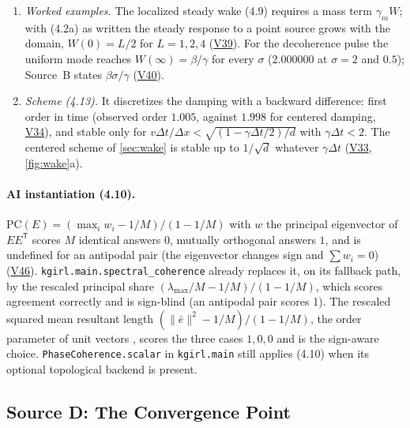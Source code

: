 \documentclass[11pt]{article}
\theoremstyle{definition}
\theoremstyle{remark}
\newcommand{\code}[1]{\texttt{#1}}
\newcommand{\V}[1]{\hyperref[app:verify]{\textsf{#1}}}
\begin{document}
\begin{enumerate}[label=(B\arabic*)]
\item \emph{Worked examples.} The localized steady wake (4.9) requires a mass term $\gamma_mW$; with (4.2a) as written the steady response to a point source grows with the domain, $W(0)=L/2$ for $L=1,2,4$ (\V{V39}). For the decoherence pulse the uniform mode reaches $W(\infty)=\beta/\gamma$ for every $\sigma$ (2.000000 at $\sigma=2$ and $0.5$); Source~B states $\beta\sigma/\gamma$ (\V{V40}).
\item \emph{Scheme (4.13).} It discretizes the damping with a backward difference: first order in time (observed order $1.005$, against $1.998$ for centered damping, \V{V34}), and stable only for $v\Delta t/\Delta x<\sqrt{(1-\gamma\Delta t/2)/d}$ with $\gamma\Delta t<2$. The centered scheme of \cref{sec:wake} is stable up to $1/\sqrt d$ whatever $\gamma\Delta t$ (\V{V33}, \cref{fig:wake}a).
\end{enumerate}

\paragraph{AI instantiation (4.10).} $\mathrm{PC}(E)=(\max_iw_i-1/M)/(1-1/M)$ with $w$ the principal eigenvector of $EE^{\mathsf T}$ scores $M$ identical answers $0$, mutually orthogonal answers $1$, and is undefined for an antipodal pair (the eigenvector changes sign and $\sum w_i=0$) (\V{V46}). \code{kgirl.main.spectral\_coherence} already replaces it, on its fallback path, by the rescaled principal share $(\lambda_{\max}/M-1/M)/(1-1/M)$, which scores agreement correctly and is sign-blind (an antipodal pair scores 1). The rescaled squared mean resultant length $(\lVert\bar e\rVert^2-1/M)/(1-1/M)$, the order parameter of unit vectors \cite{Kuramoto1984}, scores the three cases $1,0,0$ and is the sign-aware choice. \code{PhaseCoherence.scalar} in \code{kgirl.main} still applies (4.10) when its optional topological backend is present.

\subsection{Source D: The Convergence Point}\label{sec:sourceD}
\end{document}
